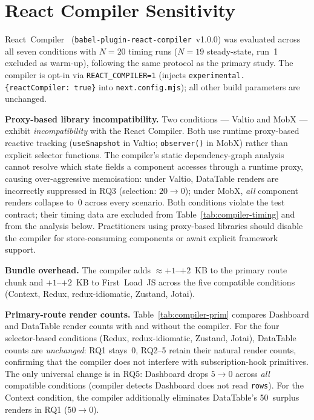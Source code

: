 \documentclass[conference]{IEEEtran}
\newcommand{\code}[1]{\texttt{\small #1}}
\begin{document}
\section{React Compiler Sensitivity}
\label{app:compiler}

React~Compiler~\cite{b13} (\code{babel-plugin-react-compiler}~v1.0.0)
was evaluated across all seven conditions with $N{=}20$ timing runs
($N{=}19$ steady-state, run~1 excluded as warm-up), following the
same protocol as the primary study.  The compiler is opt-in via
\texttt{REACT\_COMPILER=1} (injects
\code{experimental.\{reactCompiler:\,true\}} into
\code{next.config.mjs}); all other build parameters are unchanged.

\textbf{Proxy-based library incompatibility.}
Two conditions --- Valtio and MobX --- exhibit \emph{incompatibility}
with the React Compiler.  Both use runtime proxy-based reactive
tracking (\code{useSnapshot} in Valtio; \code{observer()} in MobX)
rather than explicit selector functions.  The compiler's static
dependency-graph analysis cannot resolve which state fields a component
accesses through a runtime proxy, causing over-aggressive memoisation:
under Valtio, DataTable renders are incorrectly suppressed in RQ3
(selection: $20{\to}0$); under MobX, \emph{all} component renders
collapse to~0 across every scenario.  Both conditions violate the
test contract; their timing data are excluded from
Table~\ref{tab:compiler-timing} and from the analysis below.
Practitioners using proxy-based libraries should disable the compiler
for store-consuming components or await explicit framework support.

\textbf{Bundle overhead.}
The compiler adds ${\approx}+1$--$+2$~KB to the primary route chunk
and $+1$--$+2$~KB to First~Load~JS across the five compatible
conditions (Context, Redux, redux-idiomatic, Zustand, Jotai).

\textbf{Primary-route render counts.}
Table~\ref{tab:compiler-prim} compares Dashboard and DataTable render
counts with and without the compiler.  For the four
selector-based conditions (Redux, redux-idiomatic, Zustand, Jotai),
DataTable counts are \emph{unchanged}: RQ1 stays~0, RQ2--5 retain
their natural render counts, confirming that the compiler does not
interfere with subscription-hook primitives.  The only universal
change is in RQ5: Dashboard drops $5{\to}0$ across \emph{all}
compatible conditions (compiler detects Dashboard does not
read \code{rows}).  For the Context condition, the compiler additionally
eliminates DataTable's 50~surplus renders in RQ1 ($50{\to}0$).
\end{document}
